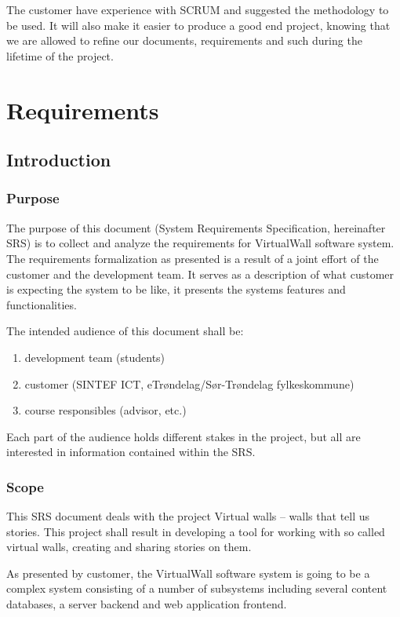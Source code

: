 \documentclass[11pt]{book}
\begin{document}
The customer have experience with SCRUM and suggested the methodology to be used. It will also make it easier to produce a good end project, knowing that we are allowed to refine our documents, requirements and such during the lifetime of the project.

\chapter{Requirements} \label{chap:srs}
\section{Introduction}

\subsection{Purpose}
The purpose of this document (System Requirements Specification, hereinafter SRS) is to collect and analyze the requirements for VirtualWall software system. The requirements formalization as presented is a result of a joint effort of the customer and the development team. It serves as a description of what customer is expecting the system to be like, it presents the systems features and functionalities.

The intended audience of this document shall be:

\begin{enumerate}
  \item development team (students)
  \item customer (SINTEF ICT, eTrøndelag/Sør-Trøndelag fylkeskommune)
  \item course responsibles (advisor, etc.)
\end{enumerate}

Each part of the audience holds different stakes in the project, but all are interested in information contained within the SRS.

\subsection{Scope}
This SRS document deals with the project Virtual walls – walls that tell us stories. This project shall result in developing a tool for working with so called virtual walls, creating and sharing stories on them.

As presented by customer, the VirtualWall software system is going to be a complex system consisting of a number of subsystems including several content databases, a server backend and web application frontend.
\end{document}
